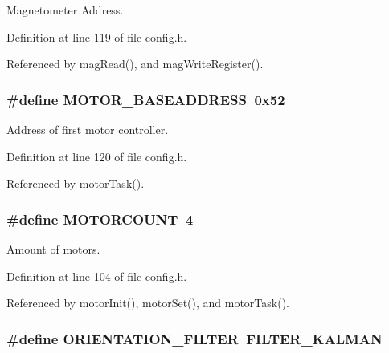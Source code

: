 Magnetometer Address. 



Definition at line 119 of file config.\-h.



Referenced by mag\-Read(), and mag\-Write\-Register().

\hypertarget{group__config_ga6e8ab18bbb1ef1b1e929c627f18224a3}{
\subsubsection[{M\-O\-T\-O\-R\-\_\-\-B\-A\-S\-E\-A\-D\-D\-R\-E\-S\-S}]{\setlength{\rightskip}{0pt plus 5cm}\#define M\-O\-T\-O\-R\-\_\-\-B\-A\-S\-E\-A\-D\-D\-R\-E\-S\-S~0x52}}\label{group__config_ga6e8ab18bbb1ef1b1e929c627f18224a3}


Address of first motor controller. 



Definition at line 120 of file config.\-h.



Referenced by motor\-Task().

\hypertarget{group__config_ga1a2c496f8bb7dbb5f1dfef5c32624a6d}{
\subsubsection[{M\-O\-T\-O\-R\-C\-O\-U\-N\-T}]{\setlength{\rightskip}{0pt plus 5cm}\#define M\-O\-T\-O\-R\-C\-O\-U\-N\-T~4}}\label{group__config_ga1a2c496f8bb7dbb5f1dfef5c32624a6d}


Amount of motors. 



Definition at line 104 of file config.\-h.



Referenced by motor\-Init(), motor\-Set(), and motor\-Task().

\hypertarget{group__config_gaf45c761b3bd949068c77712e21259564}{
\subsubsection[{O\-R\-I\-E\-N\-T\-A\-T\-I\-O\-N\-\_\-\-F\-I\-L\-T\-E\-R}]{\setlength{\rightskip}{0pt plus 5cm}\#define O\-R\-I\-E\-N\-T\-A\-T\-I\-O\-N\-\_\-\-F\-I\-L\-T\-E\-R~F\-I\-L\-T\-E\-R\-\_\-\-K\-A\-L\-M\-A\-N}}\label{group__config_gaf45c761b3bd949068c77712e21259564}


